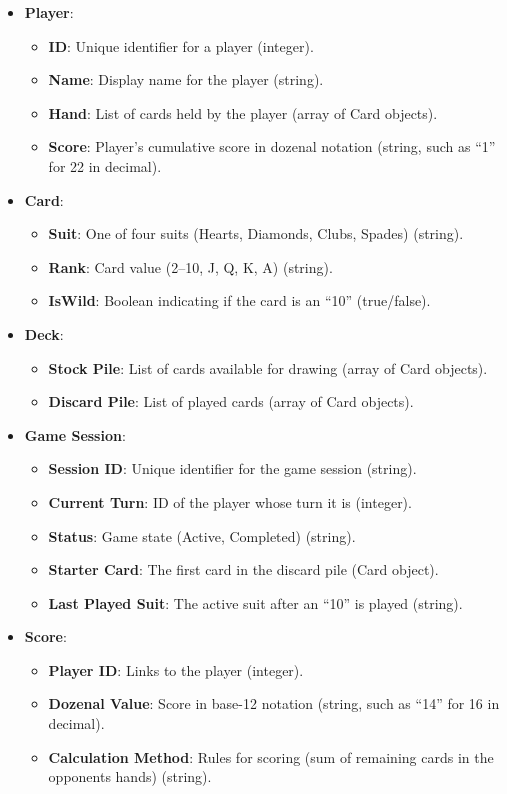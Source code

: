 \documentclass[12pt]{article}
\begin{document}
\begin{itemize}
    \item \textbf{Player}:
    \begin{itemize}
        \item \textbf{ID}: Unique identifier for a player (integer).
        \item \textbf{Name}: Display name for the player (string).
        \item \textbf{Hand}: List of cards held by the player (array of Card objects).
        \item \textbf{Score}: Player's cumulative score in dozenal notation (string, such as ``1'' for 22 in decimal).
    \end{itemize}
    \item \textbf{Card}:
    \begin{itemize}
        \item \textbf{Suit}: One of four suits (Hearts, Diamonds, Clubs, Spades) (string).
        \item \textbf{Rank}: Card value (2--10, J, Q, K, A) (string).
        \item \textbf{IsWild}: Boolean indicating if the card is an ``10'' (true/false).
    \end{itemize}
    \item \textbf{Deck}:
    \begin{itemize}
        \item \textbf{Stock Pile}: List of cards available for drawing (array of Card objects).
        \item \textbf{Discard Pile}: List of played cards (array of Card objects).
    \end{itemize}
    \item \textbf{Game Session}:
    \begin{itemize}
        \item \textbf{Session ID}: Unique identifier for the game session (string).
        \item \textbf{Current Turn}: ID of the player whose turn it is (integer).
        \item \textbf{Status}: Game state (Active, Completed) (string).
        \item \textbf{Starter Card}: The first card in the discard pile (Card object).
        \item \textbf{Last Played Suit}: The active suit after an ``10'' is played (string).
    \end{itemize}
    \item \textbf{Score}:
    \begin{itemize}
        \item \textbf{Player ID}: Links to the player (integer).
        \item \textbf{Dozenal Value}: Score in base-12 notation (string, such as ``14'' for 16 in decimal).
        \item \textbf{Calculation Method}: Rules for scoring (sum of remaining cards in the opponents hands) (string).
    \end{itemize}
\end{itemize}
\end{document}
